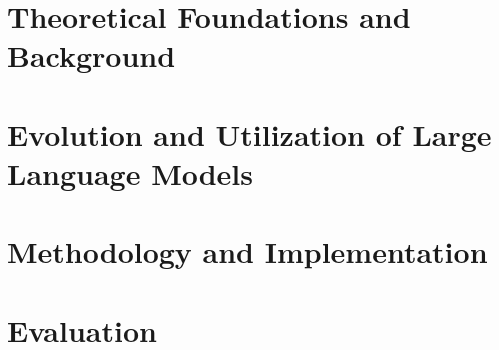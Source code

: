 \documentclass[a4paper,twoside]{book}
\begin{document}
     


\chapter{Theoretical Foundations and Background}


\chapter{Evolution and Utilization of Large Language Models}


\chapter{Methodology and Implementation}


\chapter{Evaluation}



\end{document}
